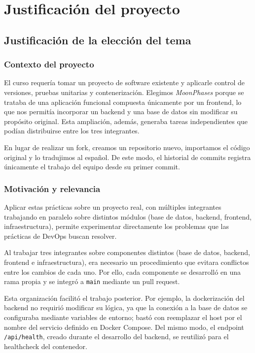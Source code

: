 \chapter{Justificación del proyecto}

\section{Justificación de la elección del tema}

\subsection{Contexto del proyecto}
El curso requería tomar un proyecto de software existente y aplicarle control de versiones, pruebas unitarias y contenerización. Elegimos \emph{MoonPhases} porque se trataba de una aplicación funcional compuesta únicamente por un frontend, lo que nos permitía incorporar un backend y una base de datos sin modificar su propósito original. Esta ampliación, además, generaba tareas independientes que podían distribuirse entre los tres integrantes.

En lugar de realizar un fork, creamos un repositorio nuevo, importamos el código original y lo tradujimos al español. De este modo, el historial de commits registra únicamente el trabajo del equipo desde su primer commit.

\subsection{Motivación y relevancia}
Aplicar estas prácticas sobre un proyecto real, con múltiples integrantes trabajando en paralelo sobre distintos módulos (base de datos, backend, frontend, infraestructura), permite experimentar directamente los problemas que las prácticas de DevOps buscan resolver.

Al trabajar tres integrantes sobre componentes distintos (base de datos, backend, frontend e infraestructura), era necesario un procedimiento que evitara conflictos entre los cambios de cada uno. Por ello, cada componente se desarrolló en una rama propia y se integró a \texttt{main} mediante un pull request.

Esta organización facilitó el trabajo posterior. Por ejemplo, la dockerización del backend no requirió modificar su lógica, ya que la conexión a la base de datos se configuraba mediante variables de entorno; bastó con reemplazar el host por el nombre del servicio definido en Docker Compose. Del mismo modo, el endpoint \texttt{/api/health}, creado durante el desarrollo del backend, se reutilizó para el healthcheck del contenedor.
